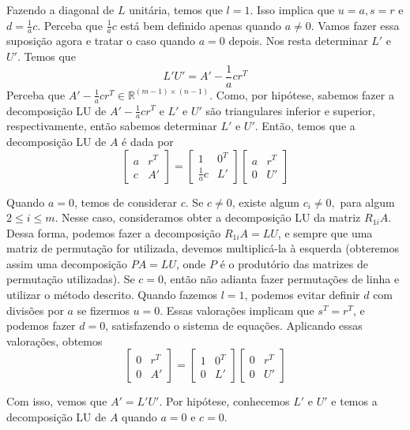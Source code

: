 \documentclass[]{article}
\numberwithin{equation}{section}
\begin{document}
Fazendo a diagonal de $L$ unitária, temos que $l = 1$. Isso implica que $u = a, s = r$ e $d = \frac{1}{a} c$. Perceba que $\frac{1}{a} c$ está bem definido apenas quando $a \neq 0$. Vamos fazer essa suposição agora e tratar o caso quando $a = 0$ depois. Nos resta determinar $L'$ e $U'$. Temos que
$$
L'U' = A' - \frac{1}{a} cr^T
$$
Perceba que $A' - \frac{1}{a} cr^T \in \mathbb{R}^{(m - 1) \times (n - 1)}$. Como, por hipótese, sabemos fazer a decomposição LU de $A' - \frac{1}{a} cr^T$ e $L'$ e $U'$ são triangulares inferior e superior, respectivamente, então sabemos determinar $L'$ e $U'$. Então, temos que a decomposição LU de $A$ é dada por
$$
\begin{bmatrix}
a & r^T \\
c & A'
\end{bmatrix}
=
\begin{bmatrix}
1 & 0^T \\
\frac{1}{a} c & L'
\end{bmatrix}
\begin{bmatrix}
a & r^T \\
0 & U'
\end{bmatrix}
$$

Quando $a = 0$, temos de considerar $c$. Se $c \neq 0$, existe algum $c_i \neq 0,$ para algum $2 \leq i \leq m$. Nesse caso, consideramos obter a decomposição LU da matriz $R_{1i}A$. Dessa forma, podemos fazer a decomposição $R_{1i}A = LU$, e sempre que uma matriz de permutação for utilizada, devemos multiplicá-la à esquerda (obteremos assim uma decomposição $PA = LU$, onde $P$ é o produtório das matrizes de permutação utilizadas). Se $c = 0$, então não adianta fazer permutações de linha e utilizar o método descrito. Quando fazemos $l = 1$, podemos evitar definir $d$ com divisões por $a$ se fizermos $u = 0$. Essas valorações implicam que $s^T = r^T$, e podemos fazer $d = 0$, satisfazendo o sistema de equações. Aplicando essas valorações, obtemos
$$
\begin{bmatrix}
0 & r^T \\
0 & A'
\end{bmatrix}
=
\begin{bmatrix}
1 & 0^T \\
0 & L'
\end{bmatrix}
\begin{bmatrix}
0 & r^T \\
0 & U'
\end{bmatrix}
$$

Com isso, vemos que $A' = L'U'$. Por hipótese, conhecemos $L'$ e $U'$ e temos a decomposição LU de $A$ quando $a = 0$ e $c = 0$.
\end{document}

